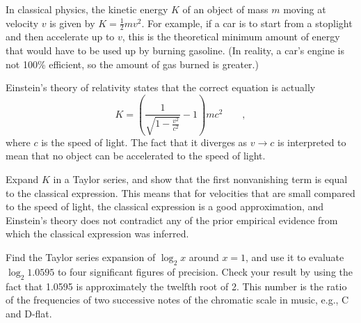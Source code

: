 \begin{hwsection}
\pagebreak

\begin{hw}
In classical physics, the kinetic energy $K$ of an object of mass $m$ moving at velocity $v$
is given by $K=\frac{1}{2}mv^2$. For example, if a car is to start from a stoplight and then
accelerate up to $v$, this is
the theoretical minimum amount of energy  that would have to be used up by burning gasoline.
(In reality, a car's engine is not 100\% efficient, so the amount of gas burned is greater.)

Einstein's theory of relativity states that the correct equation is actually
\begin{equation*}
  K = \left(\frac{1}{\sqrt{1-\frac{v^2}{c^2}}}-1\right)mc^2 \qquad ,
\end{equation*}
where $c$ is the speed of light. The fact that it diverges as $v \rightarrow c$ is interpreted
to mean that no object can be accelerated to the speed of light.

Expand $K$ in a Taylor series, and show that the first
nonvanishing term is equal to the classical expression. This means that for velocities that
are small compared to the speed of light, the classical expression is a good approximation,
and Einstein's theory does not contradict any of the prior empirical evidence from which
the classical expression was inferred.
\end{hw}

\pagebreak

\begin{hw}
Find the Taylor series expansion of $\log_2 x$ around $x=1$, and use it to evaluate
$\log_2 1.0595$ to four significant figures of precision. Check your result by using the
fact that 1.0595 is approximately the twelfth root of 2. This number is the ratio of
the frequencies of two successive notes of the chromatic scale
in music, e.g., C and D-flat.
\end{hw}


\end{hwsection}
